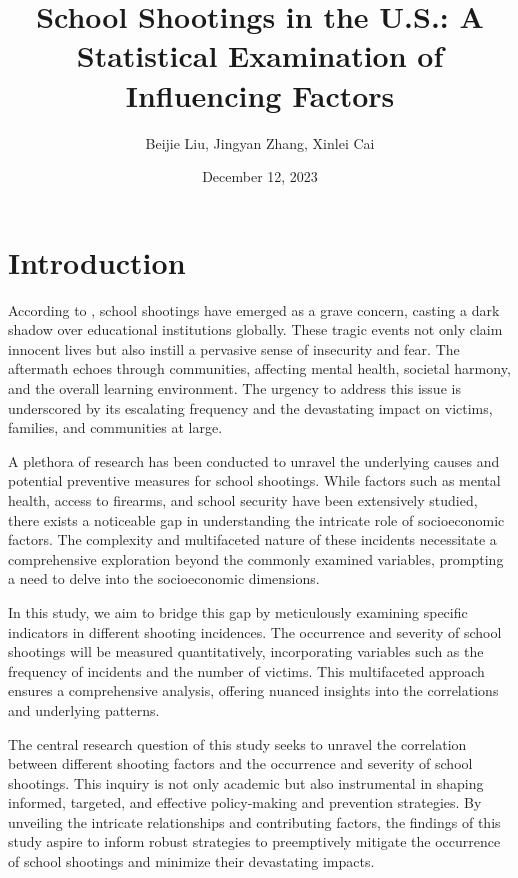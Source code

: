 \documentclass[12pt]{article}
\title{School Shootings in the U.S.: A Statistical Examination of Influencing Factors}
\author{Beijie Liu, Jingyan Zhang, Xinlei Cai}
\date{December 12, 2023}
\numberwithin{figure}{section}
\begin{document}
\maketitle

\section{Introduction}

According to \textcite{report}, school shootings have emerged as a grave concern, casting a dark shadow over educational institutions globally. These tragic events not only claim innocent lives but also instill a pervasive sense of insecurity and fear. The aftermath echoes through communities, affecting mental health, societal harmony, and the overall learning environment. The urgency to address this issue is underscored by its escalating frequency and the devastating impact on victims, families, and communities at large.

A plethora of research has been conducted to unravel the underlying causes and potential preventive measures for school shootings. While factors such as mental health, access to firearms, and school security have been extensively studied, there exists a noticeable gap in understanding the intricate role of socioeconomic factors. The complexity and multifaceted nature of these incidents necessitate a comprehensive exploration beyond the commonly examined variables, prompting a need to delve into the socioeconomic dimensions.

In this study, we aim to bridge this gap by meticulously examining specific indicators in different shooting incidences. The occurrence and severity of school shootings will be measured quantitatively, incorporating variables such as the frequency of incidents and the number of victims. This multifaceted approach ensures a comprehensive analysis, offering nuanced insights into the correlations and underlying patterns.

The central research question of this study seeks to unravel the correlation between different shooting factors and the occurrence and severity of school shootings. This inquiry is not only academic but also instrumental in shaping informed, targeted, and effective policy-making and prevention strategies. By unveiling the intricate relationships and contributing factors, the findings of this study aspire to inform robust strategies to preemptively mitigate the occurrence of school shootings and minimize their devastating impacts.
\end{document}
